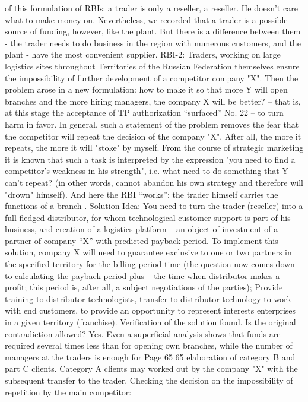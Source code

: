 of this formulation of RBIs: a trader is only a reseller, a reseller. He doesn't care
what to make money on. Nevertheless, we recorded that a trader is a possible
source of funding, however, like the plant. But there is a difference between them -
the trader needs to do business in the region with numerous customers, and the plant -
have the most convenient supplier.
RBI-2: Traders, working on large logistics sites throughout
Territories of the Russian Federation themselves ensure the impossibility of further development of a competitor
company "X".
Then the problem arose in a new formulation: how to make it so that
more Y will open branches and the more hiring managers, the company X
will be better? -- that is, at this stage the acceptance of TP authorization “surfaced”
No. 22 -- to turn harm in favor.
In general, such a statement of the problem removes the fear that the competitor will repeat
the decision of the company "X". After all, the more it repeats, the more it will "stoke"
by myself.
From the course of strategic marketing it is known that such a task
is interpreted by the expression "you need to find a competitor’s weakness in his strength", i.e. what
need to do something that Y can't repeat? (in other words, cannot
abandon his own strategy and therefore will "drown" himself).
And here the RBI “works”: the trader himself carries the functions of a branch .
Solution Idea:
You need to turn the trader (reseller) into a full-fledged distributor,
for whom technological customer support is part of his business, and
creation of a logistics platform -- an object of investment of a partner of company “X” with
predicted payback period.
To implement this solution, company X will need to guarantee
exclusive to one or two partners in the specified territory for the billing period
time (the question now comes down to calculating the payback period plus -- the time when
distributor makes a profit; this period is, after all, a subject
negotiations of the parties);
Provide training to distributor technologists, transfer to distributor
technology to work with end customers, to provide an opportunity to represent interests
enterprises in a given territory (franchise).
Verification of the solution found.
Is the original contradiction allowed? Yes. Even a superficial analysis
shows that funds are required several times less than for opening
own branches, while the number of managers at the traders is enough for
Page 65
65
elaboration of category B and part C clients. Category A clients may
worked out by the company "X" with the subsequent transfer to the trader.
Checking the decision on the impossibility of repetition by the main competitor:
